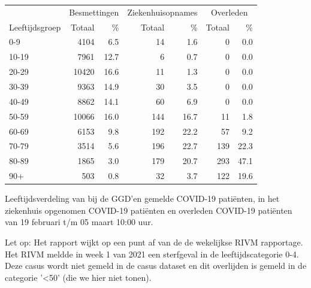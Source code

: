 \documentclass[
  english,
  man,floatsintext]{apa6}
\begin{document}
\begin{table}
\centering\begingroup\fontsize{11}{13}\selectfont

\begin{threeparttable}
\begin{tabular}{lrrrrrr}
\toprule
\multicolumn{1}{c}{ } & \multicolumn{2}{c}{Besmettingen} & \multicolumn{2}{c}{Ziekenhuisopnames} & \multicolumn{2}{c}{Overleden} \\
\cmidrule(l{3pt}r{3pt}){2-3} \cmidrule(l{3pt}r{3pt}){4-5} \cmidrule(l{3pt}r{3pt}){6-7}
Leeftijdsgroep & Totaal & \% & Totaal & \% & Totaal & \%\\
\midrule
0-9 & 4104 & 6.5 & 14 & 1.6 & 0 & 0.0\\
10-19 & 7961 & 12.7 & 6 & 0.7 & 0 & 0.0\\
20-29 & 10420 & 16.6 & 11 & 1.3 & 0 & 0.0\\
30-39 & 9363 & 14.9 & 30 & 3.5 & 0 & 0.0\\
40-49 & 8862 & 14.1 & 60 & 6.9 & 0 & 0.0\\
50-59 & 10066 & 16.0 & 144 & 16.7 & 11 & 1.8\\
60-69 & 6153 & 9.8 & 192 & 22.2 & 57 & 9.2\\
70-79 & 3514 & 5.6 & 196 & 22.7 & 139 & 22.3\\
80-89 & 1865 & 3.0 & 179 & 20.7 & 293 & 47.1\\
90+ & 503 & 0.8 & 32 & 3.7 & 122 & 19.6\\
\bottomrule
\end{tabular}
\begin{tablenotes}
\item[1] Leeftijdsverdeling van bij de GGD’en gemelde COVID-19 patiënten, in het ziekenhuis opgenomen COVID-19 patiënten en overleden COVID-19 patiënten van 19 februari t/m 05 maart 10:00 uur.
\item[2] Let op: Het rapport wijkt op een punt af van de de wekelijkse RIVM rapportage. Het RIVM meldde in week 1 van 2021 een sterfgeval in de leeftijdscategorie 0-4. Deze casus wordt niet gemeld in de casus dataset en dit overlijden is gemeld in de categorie '<50' (die we hier niet tonen).
\end{tablenotes}
\end{threeparttable}
\endgroup{}
\end{table}

\newpage
\end{document}
